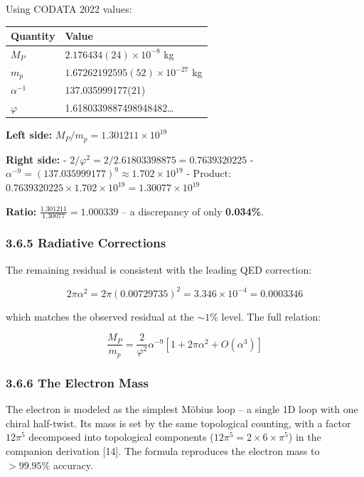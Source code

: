 \documentclass[
  11pt,
]{article}
\begin{document}
Using CODATA 2022 values:

\begin{longtable}[]{@{}ll@{}}
\toprule\noalign{}
Quantity & Value \\
\midrule\noalign{}
\endhead
\bottomrule\noalign{}
\endlastfoot
\(M_P\) & \(2.176434(24) \times 10^{-8}\) kg \\
\(m_p\) & \(1.67262192595(52) \times 10^{-27}\) kg \\
\(\alpha^{-1}\) & 137.035999177(21) \\
\(\varphi\) & 1.6180339887498948482\ldots{} \\
\end{longtable}

\textbf{Left side:} \(M_P/m_p = 1.301211 \times 10^{19}\)

\textbf{Right side:} - \(2/\varphi^2 = 2/2.61803398875 = 0.7639320225\)
- \(\alpha^{-9} = (137.035999177)^9 \approx 1.702 \times 10^{19}\) -
Product:
\(0.7639320225 \times 1.702 \times 10^{19} = 1.30077 \times 10^{19}\)

\textbf{Ratio:} \(\frac{1.301211}{1.30077} = 1.000339\) -- a discrepancy
of only \textbf{0.034\%}.

\subsubsection{3.6.5 Radiative Corrections}\label{radiative-corrections}

The remaining residual is consistent with the leading QED correction:

\[2\pi\alpha^2 = 2\pi(0.00729735)^2 = 3.346 \times 10^{-4} = 0.0003346\]

which matches the observed residual at the \(\sim 1\%\) level. The full
relation:

\[\frac{M_P}{m_p} = \frac{2}{\varphi^2} \alpha^{-9} \left[1 + 2\pi\alpha^2 + O(\alpha^3)\right]\]

\subsubsection{3.6.6 The Electron Mass}\label{the-electron-mass}

The electron is modeled as the simplest Möbius loop -- a single 1D loop
with one chiral half-twist. Its mass is set by the same topological
counting, with a factor \(12\pi^5\) decomposed into topological
components (\(12\pi^5 = 2 \times 6 \times \pi^5\)) in the companion
derivation {[}14{]}. The formula reproduces the electron mass to
\(> 99.95\%\) accuracy.
\end{document}
